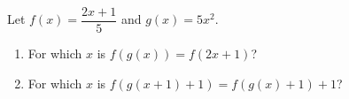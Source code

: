 Let $f(x)=\dfrac{2x+1}{5}$ and $g(x)=5x^2$.
\begin{enumerate}
\item[(a)] For which $x$ is $f(g(x))=f(2x+1)$?
\item[(b)] For which $x$ is $f(g(x+1)+1)=f(g(x)+1)+1$?
\end{enumerate}
